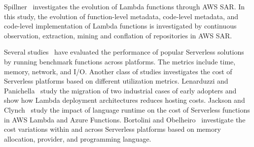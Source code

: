Spillner~\cite{spillner2019quantitative} investigates the 
evolution of Lambda functions through AWS SAR. 
In this study, the evolution of function-level metadata, 
code-level metadata, and code-level implementation of 
Lambda functions is investigated by continuous observation, 
extraction, mining and conflation of repositories in AWS SAR.


Several studies~\cite{wang2018peeking,lloyd2018serverless,figiela2018performance,lee2018evaluation,mcgrath2017serverless,back2018using,mohanty2018evaluation} 
have evaluated the performance of popular Serverless solutions by running 
benchmark functions across platforms. The metrics include time, 
memory, network, and I/O. Another class of studies investigates the cost of Serverless platforms 
based on different utilization metrics. Lenarduzzi and Panichella~\cite{adzic2017serverless} 
study the migration of two industrial cases of early adopters
and show how Lambda deployment architectures reduces hosting costs. 
Jackson and Clynch~\cite{jackson2018investigation} study the impact of 
language runtime on the cost of Serverless functions in AWS Lambda and 
Azure Functions. Bortolini and Obelheiro~\cite{bortolini2019investigating} 
investigate the cost variations within and across Serverless platforms 
based on memory allocation, provider, and 
programming language. 



